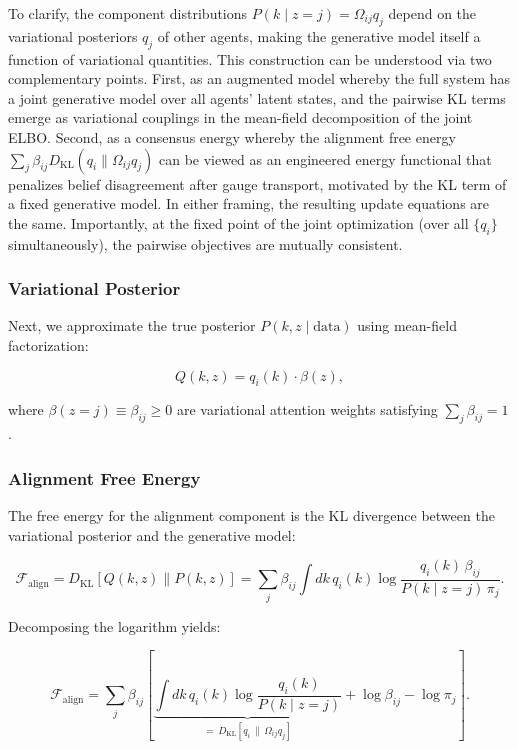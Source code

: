 \documentclass[twoside,11pt]{article}
\begin{document}
To clarify, the component distributions $P(k \mid z{=}j) = \Omega_{ij}q_j$ depend on the variational posteriors $q_j$ of other agents, making the generative model itself a function of variational quantities. This construction can be understood via two complementary points. First, as an augmented model whereby the full system has a joint generative model over all agents' latent states, and the pairwise KL terms emerge as variational couplings in the mean-field decomposition of the joint ELBO.  Second, as a consensus energy whereby the alignment free energy $\sum_j \beta_{ij} D_{\mathrm{KL}}(q_i \| \Omega_{ij}q_j)$ can be viewed as an engineered energy functional that penalizes belief disagreement after gauge transport, motivated by the KL term of a fixed generative model. In either framing, the resulting update equations are the same. Importantly, at the fixed point of the joint optimization (over all $\{q_i\}$ simultaneously), the pairwise objectives are mutually consistent.

\subsubsection{Variational Posterior}

Next, we approximate the true posterior $P(k, z \mid \text{data})$ using mean-field factorization:

\begin{equation}
Q(k, z) = q_i(k) \cdot \beta(z),
\label{eq:mixture_posterior}
\end{equation}

where $\beta(z = j) \equiv \beta_{ij} \geq 0$ are variational attention weights satisfying $\sum_j \beta_{ij} = 1$.

\subsubsection{Alignment Free Energy}

The free energy for the alignment component is the KL divergence between the variational posterior and the generative model:

\begin{equation}
\mathcal{F}_{\text{align}} = D_{\mathrm{KL}}[Q(k,z) \| P(k,z)] = \sum_j \beta_{ij} \int dk\, q_i(k) \log \frac{q_i(k)\, \beta_{ij}}{P(k \mid z{=}j)\, \pi_j}.
\end{equation}

Decomposing the logarithm yields:

\begin{equation}
\mathcal{F}_{\text{align}} = \sum_j \beta_{ij} \left[ \underbrace{\int dk\, q_i(k) \log \frac{q_i(k)}{P(k \mid z{=}j)}}_{= \, D_{\mathrm{KL}}[q_i \,\|\, \Omega_{ij} q_j]} + \log \beta_{ij} - \log \pi_j \right].
\label{eq:mixture_free_energy}
\end{equation}
\end{document}
